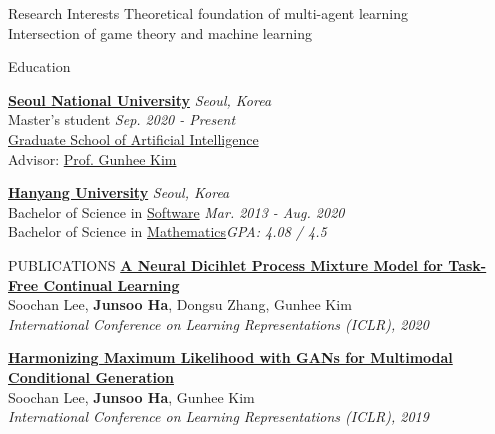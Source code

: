 \documentclass{resume} %
\begin{document}
	
	

\begin{rSection}{Research Interests}
	Theoretical foundation of multi-agent learning \\
	Intersection of game theory and machine learning
\end{rSection}
	


\begin{rSection}{Education}

{\bf \href{https://www.snu.ac.kr/index.html}{Seoul National University}} \hfill{\em Seoul, Korea} \\
Master's student \hfill {\em Sep. 2020 - Present} \\ 
\href{https://gsai.snu.ac.kr/}{Graduate School of Artificial Intelligence} \\
Advisor: \href{https://vision.snu.ac.kr/gunhee/}{Prof. Gunhee Kim}


{\bf \href{https://www.hanyang.ac.kr/}{Hanyang University}} \hfill{\em Seoul, Korea} \\
Bachelor of Science in \href{http://cs.hanyang.ac.kr/}{Software} \hfill {\em Mar. 2013 - Aug. 2020} \\ 
Bachelor of Science in \href{http://math.hanyang.ac.kr}{Mathematics}\hfill{\em GPA: 4.08 / 4.5}

\end{rSection}


\begin{rSection}{PUBLICATIONS}
	{\bf \href{https://openreview.net/forum?id=SJxSOJStPr}{A Neural Dicihlet Process Mixture Model for Task-Free Continual Learning}} \\ 
	Soochan Lee, {\bf Junsoo Ha}, Dongsu Zhang, Gunhee Kim \\
	{\em International Conference on Learning Representations (ICLR), 2020}
	
	
	{\bf \href{https://openreview.net/forum?id=HJxyAjRcFX}{Harmonizing Maximum Likelihood with GANs for Multimodal Conditional Generation}} \\ 
	Soochan Lee, {\bf Junsoo Ha}, Gunhee Kim \\
	{\em International Conference on Learning Representations (ICLR), 2019}
\end{rSection}
\end{document}
